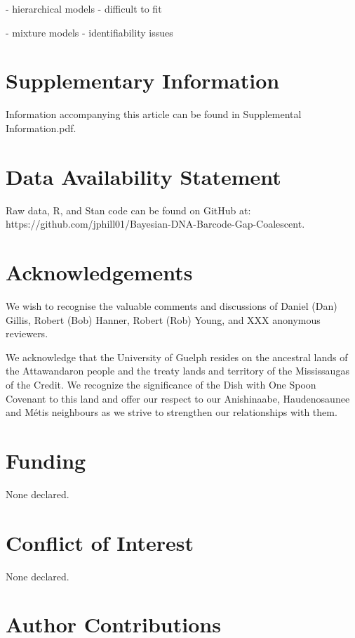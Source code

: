 \documentclass[12pt]{article}
\begin{document}
- hierarchical models - difficult to fit

- mixture models - identifiability issues

\newpage

\section*{Supplementary Information}

Information accompanying this article can be found in Supplemental Information.pdf.

\section*{Data Availability Statement}

Raw data, R, and Stan code can be found on GitHub at: \\ https://github.com/jphill01/Bayesian-DNA-Barcode-Gap-Coalescent.

\section*{Acknowledgements}

We wish to recognise the valuable comments and discussions of Daniel (Dan) Gillis, Robert (Bob) Hanner, Robert (Rob) Young, and XXX anonymous reviewers.

We acknowledge that the University of Guelph resides on the ancestral lands of the Attawandaron people and the treaty lands and territory of the Mississaugas of the Credit. We recognize the significance of the Dish with One Spoon Covenant to this land and offer our respect to our Anishinaabe, Haudenosaunee and M{\'e}tis neighbours as we strive to strengthen our relationships with them.

\section*{Funding}

None declared.

\section*{Conflict of Interest}

None declared.

\section*{Author Contributions}
\end{document}
